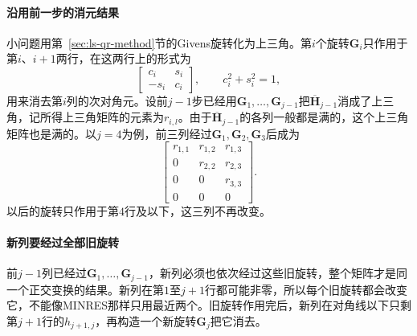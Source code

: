 \paragraph{沿用前一步的消元结果}
小问题用第~\ref{sec:ls-qr-method}节的Givens旋转化为上三角。第$i$个旋转$\bm G_i$只作用于第$i$、$i+1$两行，在这两行上的形式为
\[
 \begin{bmatrix}c_i&s_i\\-s_i&c_i\end{bmatrix},\qquad c_i^2+s_i^2=1 ,
\]
用来消去第$i$列的次对角元。设前$j-1$步已经用$\bm G_1,\ldots,\bm G_{j-1}$把$\overline{\bm H}_{j-1}$消成了上三角，记所得上三角矩阵的元素为$r_{i,l}$。由于$\overline{\bm H}_{j-1}$的各列一般都是满的，这个上三角矩阵也是满的。以$j=4$为例，前三列经过$\bm G_1,\bm G_2,\bm G_3$后成为
\[
 \begin{bmatrix}
 r_{1,1}&r_{1,2}&r_{1,3}\\
 0&r_{2,2}&r_{2,3}\\
 0&0&r_{3,3}\\
 0&0&0
 \end{bmatrix}.
\]
以后的旋转只作用于第$4$行及以下，这三列不再改变。

\paragraph{新列要经过全部旧旋转}
前$j-1$列已经过$\bm G_1,\ldots,\bm G_{j-1}$，新列必须也依次经过这些旧旋转，整个矩阵才是同一个正交变换的结果。新列在第$1$至$j+1$行都可能非零，所以每个旧旋转都会改变它，不能像MINRES那样只用最近两个。旧旋转作用完后，新列在对角线以下只剩第$j+1$行的$h_{j+1,j}$，再构造一个新旋转$\bm G_j$把它消去。

